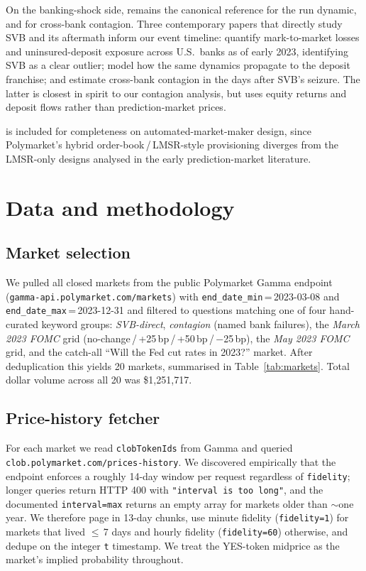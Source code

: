 \documentclass{article}
\begin{document}
On the banking-shock side, \citet{diamond_dybvig_1983} remains the
canonical reference for the run dynamic, and
\citet{allen_gale_2000} for cross-bank contagion.  Three contemporary papers
that directly study SVB and its aftermath inform our event timeline:
\citet{jiang_etal_2023} quantify mark-to-market losses and uninsured-deposit
exposure across U.S.\ banks as of early 2023, identifying SVB as a clear
outlier; \citet{drechsler_etal_2023} model how the same dynamics propagate
to the deposit franchise; and \citet{choi_etal_2023} estimate cross-bank
contagion in the days after SVB's seizure.  The latter is closest in
spirit to our contagion analysis, but uses equity returns and deposit
flows rather than prediction-market prices.

\citet{hanson_2003} is included for completeness on automated-market-maker
design, since Polymarket's hybrid order-book\,/\,LMSR-style provisioning
diverges from the LMSR-only designs analysed in the early
prediction-market literature.

\section{Data and methodology}
\label{sec:method}

\subsection{Market selection}

We pulled all closed markets from the public Polymarket Gamma endpoint
(\texttt{gamma-api.polymarket.com/markets}) with
\texttt{end\_date\_min}\,=\,2023-03-08 and \texttt{end\_date\_max}\,=\,2023-12-31
and filtered to questions matching one of four hand-curated keyword
groups: \emph{SVB-direct}, \emph{contagion} (named bank failures), the
\emph{March 2023 FOMC} grid (no-change\,/\,+25\,bp\,/\,+50\,bp\,/\,$-$25\,bp),
the \emph{May 2023 FOMC} grid, and the catch-all ``Will the Fed cut rates
in 2023?'' market.  After deduplication this yields 20 markets, summarised
in Table~\ref{tab:markets}.  Total dollar volume across all 20 was
\$1{,}251{,}717.

\subsection{Price-history fetcher}

For each market we read \texttt{clobTokenIds} from Gamma and queried
\texttt{clob.polymarket.com/prices-his\-tory}.  We discovered empirically
that the endpoint enforces a roughly 14-day window per request regardless
of \texttt{fidelity}; longer queries return HTTP 400 with
\texttt{"interval is too long"}, and the documented
\texttt{interval=max} returns an empty array for markets older than
$\sim$one year.  We therefore page in 13-day chunks, use minute fidelity
(\texttt{fidelity=1}) for markets that lived $\leq$\,7 days and hourly
fidelity (\texttt{fidelity=60}) otherwise, and dedupe on the integer
\texttt{t} timestamp.  We treat the YES-token midprice as the market's
implied probability throughout.
\end{document}
